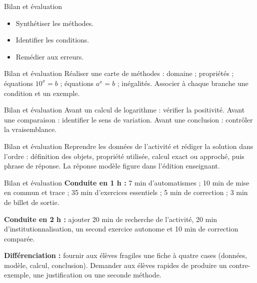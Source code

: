 \documentclass[aspectratio=169,10pt]{beamer}
\begin{document}
\begin{frame}{Bilan et évaluation}
\begin{itemize}
\item Synthétiser les méthodes.
\item Identifier les conditions.
\item Remédier aux erreurs.

\end{itemize}
\end{frame}
\begin{frame}{Bilan et évaluation}
Réaliser une carte de méthodes : domaine ; propriétés ; équations \(10^x=b\) ; équations \(a^x=b\) ; inégalités. Associer à chaque branche une condition et un exemple.
\end{frame}
\begin{frame}{Bilan et évaluation}
Avant un calcul de logarithme : vérifier la positivité. Avant une comparaison : identifier le sens de variation. Avant une conclusion : contrôler la vraisemblance.
\end{frame}
\begin{frame}{Bilan et évaluation}
Reprendre les données de l'activité et rédiger la solution dans l'ordre : définition des objets, propriété utilisée, calcul exact ou approché, puis phrase de réponse. La réponse modèle figure dans l'édition enseignant.
\end{frame}
\begin{frame}{Bilan et évaluation}
\textbf{Conduite en 1 h :} 7 min d'automatismes ; 10 min de mise en commun et trace ; 35 min d'exercices essentiels ; 5 min de correction ; 3 min de billet de sortie.

\textbf{Conduite en 2 h :} ajouter 20 min de recherche de l'activité, 20 min d'institutionnalisation, un second exercice autonome et 10 min de correction comparée.

\textbf{Différenciation :} fournir aux élèves fragiles une fiche à quatre cases (données, modèle, calcul, conclusion). Demander aux élèves rapides de produire un contre-exemple, une justification ou une seconde méthode.
\end{frame}
\end{document}
